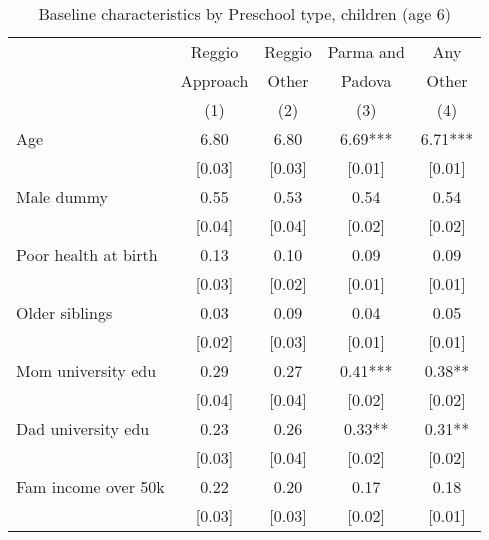 \begin{table}[H]
\caption{Baseline characteristics by Preschool type, children (age 6)}
\label{tab:child_CONTROLmaterna}
\centering
\begin{adjustbox}{max height=\dimexpr\textheight-5.5cm\relax,max width=\textwidth}
\small
\begin{tabular}{l cccc}
\hline \hline 
 & Reggio & Reggio & Parma and & Any \\
 & Approach & Other & Padova & Other \\
 &   (1)    &  (2)  & (3)    &  (4) \\
\hline 

Age & 6.80 & 6.80 & 6.69*** & 6.71*** \\
 & [0.03] & [0.03] & [0.01] & [0.01] \\
Male dummy & 0.55 & 0.53 & 0.54 & 0.54 \\
 & [0.04] & [0.04] & [0.02] & [0.02] \\
Poor health at birth & 0.13 & 0.10 & 0.09 & 0.09 \\
 & [0.03] & [0.02] & [0.01] & [0.01] \\
Older siblings  & 0.03 & 0.09 & 0.04 & 0.05 \\
 & [0.02] & [0.03] & [0.01] & [0.01] \\
Mom university edu  & 0.29 & 0.27 & 0.41*** & 0.38** \\
 & [0.04] & [0.04] & [0.02] & [0.02] \\
Dad university edu  & 0.23 & 0.26 & 0.33** & 0.31** \\
 & [0.03] & [0.04] & [0.02] & [0.02] \\
Fam income over 50k  & 0.22 & 0.20 & 0.17 & 0.18 \\
 & [0.03] & [0.03] & [0.02] & [0.01] \\

\end{tabular}
\end{adjustbox}
\end{table}
